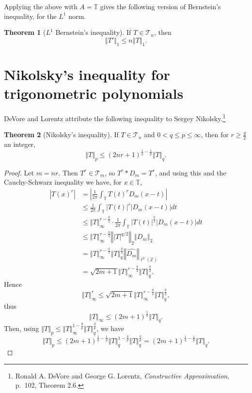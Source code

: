 \documentclass{article}
\newcommand{\norm}[1]{\left\Vert #1 \right\Vert}
\theoremstyle{definition}
\newtheorem{theorem}{Theorem}
\theoremstyle{definition}
\begin{document}
Applying the above with $A=\mathbb{T}$ gives the following version of Bernstein's inequality, for
the $L^1$ norm.

\begin{theorem}[$L^1$ Bernstein's inequality]
If $T \in \mathscr{T}_n$, then 
\[
\norm{T'}_1 \leq n \norm{T}_1.
\]
\end{theorem}


\section{Nikolsky's inequality for trigonometric polynomials}
DeVore and Lorentz attribute the following inequality to Sergey Nikolsky.\footnote{Ronald A. DeVore and George G. Lorentz,
{\em Constructive Approximation}, p.~102, Theorem 2.6.}

\begin{theorem}[Nikolsky's inequality]
If $T \in \mathscr{T}_n$ and $0<q \leq p \leq \infty$, then for $r \geq \frac{q}{2}$ an integer,
\[
\norm{T}_p \leq (2nr+1)^{\frac{1}{q}-\frac{1}{p}} \norm{T}_q.
\]
\end{theorem}
\begin{proof}
Let $m=nr$. Then $T^r \in \mathscr{T}_m$, so $T^r * D_m = T^r$, and using this and the Cauchy-Schwarz inequality we have,
for $x \in \mathbb{T}$,
\begin{align*}
|T(x)^r|&= \left| \frac{1}{2\pi} \int_{\mathbb{T}} T(t)^r D_m(x-t)\right|\\
&\leq  \frac{1}{2\pi} \int_{\mathbb{T}} |T(t)|^r |D_m(x-t)| dt\\
&\leq  \norm{T}_\infty^{r-\frac{q}{2}}  \cdot \frac{1}{2\pi} \int_{\mathbb{T}}
|T(t)|^{\frac{q}{2}} |D_m(x-t)| dt\\
&\leq   \norm{T}_\infty^{r-\frac{q}{2}} \norm{ |T|^{q/2}}_2 \norm{D_m}_2\\
&= \norm{T}_\infty^{r-\frac{q}{2}} \norm{T}_q^{\frac{q}{2}} \norm{\widehat{D_m}}_{\ell^2(\mathbb{Z})}\\
&=\sqrt{2m+1}  \norm{T}_\infty^{r-\frac{q}{2}} \norm{T}_q^{\frac{q}{2}}.
\end{align*}
Hence
\[
\norm{T}_\infty^r \leq \sqrt{2m+1}  \norm{T}_\infty^{r-\frac{q}{2}} \norm{T}_q^{\frac{q}{2}},
\]
thus
\[
\norm{T}_\infty \leq  (2m+1)^{\frac{1}{q}}  \norm{T}_q.
\]
Then, using
$\norm{T}_p \leq \norm{T}_\infty^{1-\frac{q}{p}} \norm{T}_q^{\frac{q}{p}}$,
we have
\[
\norm{T}_p \leq (2m+1)^{\frac{1}{q}-\frac{1}{p}} \norm{T}_q^{1-\frac{q}{p}}
\norm{T}_q^{\frac{q}{p}}
=(2m+1)^{\frac{1}{q}-\frac{1}{p}} \norm{T}_q.
\]
\end{proof}
\end{document}
